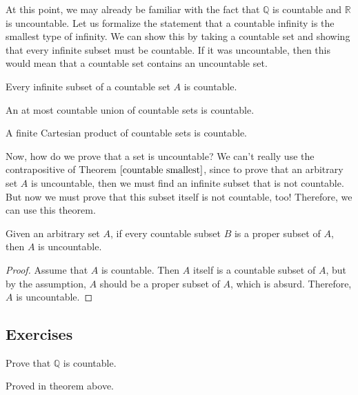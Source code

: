   At this point, we may already be familiar with the fact that $\mathbb{Q}$ is countable and $\mathbb{R}$ is uncountable. Let us formalize the statement that a countable infinity is the smallest type of infinity. We can show this by taking a countable set and showing that every infinite subset must be countable. If it was uncountable, then this would mean that a countable set contains an uncountable set. 

  \begin{theorem}
    \label{countable smallest}
    Every infinite subset of a countable set $A$ is countable. 
  \end{theorem}

  \begin{theorem}
    An at most countable union of countable sets is countable. 
  \end{theorem}

  \begin{theorem}
    A finite Cartesian product of countable sets is countable. 
  \end{theorem}

  Now, how do we prove that a set is uncountable? We can't really use the contrapositive of Theorem $\ref{countable smallest}$, since to prove that an arbitrary set $A$ is uncountable, then we must find an infinite subset that is not countable. But now we must prove that this subset itself is not countable, too! Therefore, we can use this theorem. 

  \begin{theorem}
    Given an arbitrary set $A$, if every countable subset $B$ is a proper subset of $A$, then $A$ is uncountable. 
  \end{theorem}
  \begin{proof}
    Assume that $A$ is countable. Then $A$ itself is a countable subset of $A$, but by the assumption, $A$ should be a proper subset of $A$, which is absurd. Therefore, $A$ is uncountable. 
  \end{proof}

\subsection{Exercises}

  \begin{exercise}
    Prove that $\mathbb{Q}$ is countable. 
  \end{exercise}
  \begin{solution}
    Proved in theorem above. 
  \end{solution}


